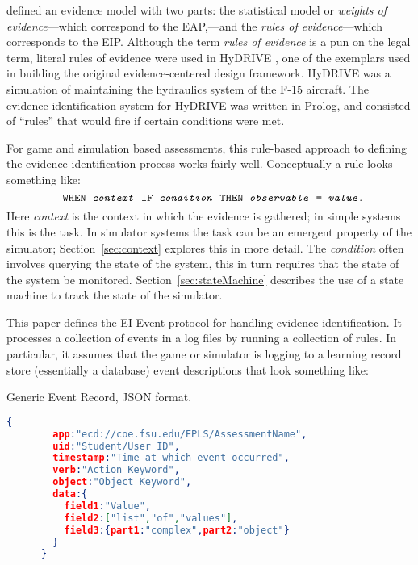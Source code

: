 \documentclass{article}
\begin{document}
   defined an evidence model with two parts:
  the statistical model or \textit{weights of evidence}---which
  correspond to the EAP,---and the \textit{rules of evidence}---which
  corresponds to the EIP.  Although the term \textit{rules of
    evidence} is a pun on the legal term, literal rules of evidence
  were used in HyDRIVE \cite{HyDRIVE}, one of the exemplars used in
  building the original evidence-centered design framework.  HyDRIVE
  was a simulation of maintaining the hydraulics system of the F-15
  aircraft.  The evidence identification system for HyDRIVE was
  written in Prolog, and consisted of ``rules'' that would fire if
  certain conditions were met.

  For game and simulation based assessments, this rule-based approach
  to defining the evidence identification process works fairly well.
  Conceptually a rule looks something like:
  \begin{equation*}
    \texttt{ WHEN \emph{context} IF \emph{condition} THEN
      \emph{observable} = \emph{value}}.
  \end{equation*}
  Here \emph{context} is the context in which the evidence is
  gathered; in simple systems this is the task.  In simulator systems
  the task can be an emergent property of the simulator;
  Section~\ref{sec:context} explores this in more detail. The
  \emph{condition} often involves querying the state of the system,
  this in turn requires that the state of the system be monitored.
  Section~\ref{sec:stateMachine} describes the use of a state machine
  to track the state of the simulator.

  This paper defines the EI-Event protocol for handling evidence
  identification.  It processes a collection of events in a log files
  by running a collection of rules.  In particular, it assumes that
  the game or simulator is logging to a learning record store
  (essentially a database) event descriptions that look something
  like:
  
  \begin{algorithm}
    \caption{Generic Event Record, JSON format.}
    \label{json:event}
    \begin{lstlisting}[language=json]
      {
        app:"ecd://coe.fsu.edu/EPLS/AssessmentName",
        uid:"Student/User ID",
        timestamp:"Time at which event occurred",
        verb:"Action Keyword",
        object:"Object Keyword",
        data:{
          field1:"Value",
          field2:["list","of","values"],
          field3:{part1:"complex",part2:"object"}
        }
      }
  \end{lstlisting}
  \end{algorithm}
\end{document}
